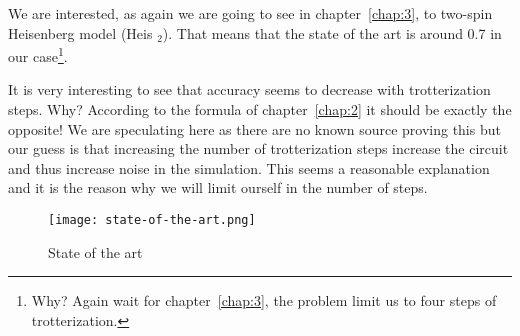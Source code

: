 We are interested, as again we are going to see in chapter~\ref{chap:3}, to two-spin Heisenberg model (Heis ${ }_{2}$). That means that the state of the art is around 0.7 in our case\footnote{Why? Again wait for chapter~\ref{chap:3}, the problem limit us to four steps of trotterization.}.

It is very interesting to see that accuracy seems to decrease with trotterization steps. Why? According to the formula of chapter~\ref{chap:2} it should be exactly the opposite! We are speculating here as there are no known source proving this but our guess is that increasing the number of trotterization steps increase the circuit and thus increase noise in the simulation. This seems a reasonable explanation and it is the reason why we will limit ourself in the number of steps.
\begin{figure}[htb]
\texttt{[image: state-of-the-art.png]}
\centering
\caption{State of the art~\cite{UQC}}
\label{fig:state-of-the-art}
\end{figure}


